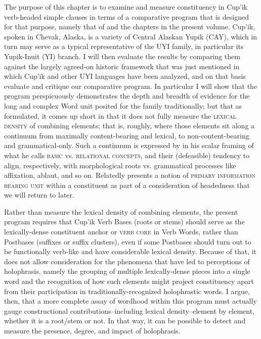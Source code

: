 \documentclass[output=paper]{langscibook}
\begin{document}
The purpose of this chapter is to examine and measure constituency in Cup'ik verb-headed simple clauses in terms of a comparative program that is designed for that purpose, namely that of \citet{Tallman2021} and the chapters in the present volume. Cup'ik, spoken in Chevak, Alaska, is a variety of Central Alaskan Yupik (CAY), which in turn may serve as a typical representative of the UYI family, in particular its Yupik-Inuit (YI) branch. I will then evaluate the results by comparing them against the largely agreed-on historic framework that was just mentioned in which Cup'ik and other UYI languages have been analyzed, and on that basis evaluate and critique our comparative program. In particular I will show that the program perspicuously demonstrates the depth and breadth of evidence for the long and complex Word unit posited for the family traditionally; but that as formulated, it comes up short in that it does not fully measure the \textsc{lexical} \textsc{density} of combining elements; that is, roughly, where those elements sit along a continuum from maximally content-bearing and lexical, to non-content-bearing and grammatical-only. Such a continuum is expressed by \citet[106--126]{Sapir1921} in his scalar framing of what he calls \textsc{basic} vs. \textsc{relational} \textsc{concepts}, and their (defeasible) tendency to align, respectively, with morphological roots vs. grammatical processes like affixation, ablaut, and so on. Relatedly \citet[244]{Croft2001} presents a notion of \textsc{primary} \textsc{information} \textsc{bearing} \textsc{unit} within a constituent as part of a consideration of headedness that we will return to later.

Rather than measure the lexical density of combining elements, the present program requires that Cup'ik Verb Bases (roots or stems) should serve as the lexically-dense constituent anchor or \textsc{verb} \textsc{core} in Verb Words, rather than Postbases (suffixes or suffix clusters), even if some Postbases should turn out to be functionally verb-like and have considerable lexical density. Because of that, it does not allow consideration for the phenomena that have led to perceptions of holophrasis, namely the grouping of multiple lexically-dense pieces into a single word and the recognition of how such elements might project constituency apart from their participation in traditionally-recognized holophrastic words. I argue, then, that a more complete assay of wordhood within this program must actually gauge constructional contributions--including lexical density--element by element, whether it is a root/stem or not. In that way, it can be possible to detect and measure the presence, degree, and impact of holophrasis.
\end{document}
